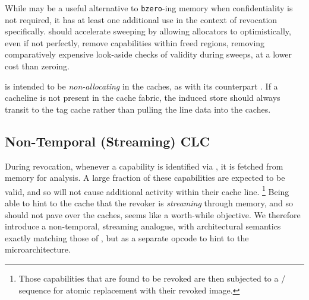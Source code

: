 While  may be a useful alternative to
\texttt{bzero}-ing memory when confidentiality is not required, it has at
least one additional use in the context of revocation specifically.
 should accelerate sweeping by allowing allocators
to optimistically, even if not perfectly, remove capabilities within freed
regions, removing comparatively expensive look-aside checks of validity
during sweeps, at a lower cost than zeroing.

 is intended to be \emph{non-allocating} in the caches,
as with its counterpart .  If a cacheline is not present
in the cache fabric, the induced store should always transit to the tag cache
rather than pulling the line data into the caches.


\subsection{Non-Temporal (Streaming) CLC} %
\label{app:exp:clcnt}

During revocation, whenever a capability is identified via
, it is fetched from memory for analysis.  A large
fraction of these capabilities are expected to be valid, and so will not
cause additional activity within their cache line.%
%
\footnote{Those capabilities that are found to be revoked are then subjected
to a / sequence for atomic replacement
with their revoked image.}
%
Being able to hint to the cache that the revoker is \emph{streaming} through
memory, and so should not pave over the caches, seems like a worth-while
objective.  We therefore introduce a non-temporal, streaming
 analogue,  with architectural semantics
exactly matching those of , but as a separate opcode to
hint to the microarchitecture.

